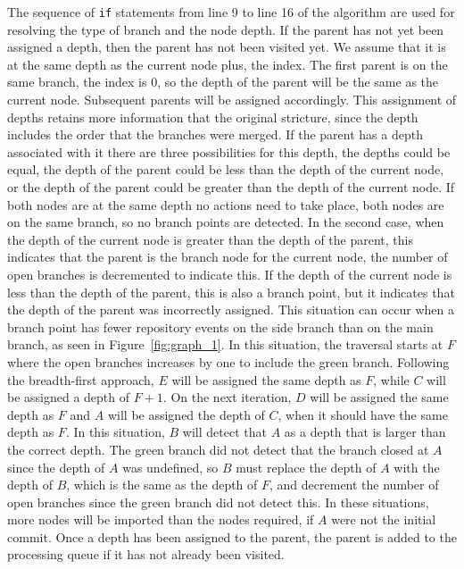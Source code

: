 The sequence of \verb|if| statements from line 9 to line 16 of the
algorithm are used for resolving the type of branch and the node depth.
If the parent has not yet been assigned a depth, then the parent has not
been visited yet. We assume that it is at the same depth as the current
node plus, the index. The first parent is on the same branch, the index
is 0, so the depth of the parent will be the same as the current node.
Subsequent parents will be assigned accordingly. This assignment of
depths retains more information that the original \mt{} stricture, since
the depth includes the order that the branches were merged. If the
parent has a depth associated with it there are three possibilities for
this depth, the depths could be equal, the depth of the parent could be
less than the depth of the current node, or the depth of the parent
could be greater than the depth of the current node. If both nodes are
at the same depth no actions need to take place, both nodes are on the
same branch, so no branch points are detected. In the second case, when
the depth of the current node is greater than the depth of the parent,
this indicates that the parent is the branch node for the current node,
the number of open branches is decremented to indicate this. If the
depth of the current node is less than the depth of the parent, this is
also a branch point, but it indicates that the depth of the parent was
incorrectly assigned. This situation can occur when a branch point has
fewer repository events on the side branch than on the main branch, as
seen in Figure~\ref{fig:graph_1}. In this situation, the traversal
starts at $F$ where the open branches increases by one to include the
green branch. Following the breadth-first approach, $E$ will be assigned
the same depth as $F$, while $C$ will be assigned a depth of $F + 1$. On
the next iteration, $D$ will be assigned the same depth as $F$ and $A$
will be assigned the depth of $C$, when it should have the same depth as
$F$. In this situation, $B$ will detect that $A$ as a depth that is
larger than the correct depth. The green branch did not detect that the
branch closed at $A$ since the depth of $A$ was undefined, so $B$ must
replace the depth of $A$ with the depth of $B$, which is the same as the
depth of $F$, and decrement the number of open branches since the green
branch did not detect this. In these situations, more nodes will be
imported than the nodes required, if $A$ were not the initial commit.
Once a depth has been assigned to the parent, the parent is added to the
processing queue if it has not already been visited.

